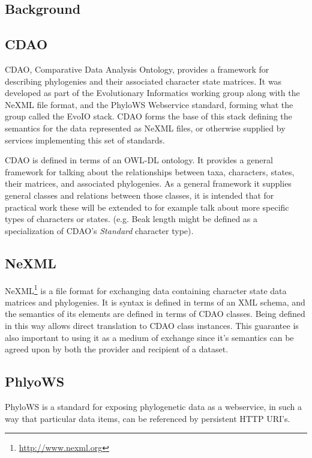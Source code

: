 \documentclass[10pt]{bmc_article}
\newenvironment{bmcformat}{\begin{raggedright}\baselineskip20pt\sloppy\setboolean{publ}{false}}{\end{raggedright}\baselineskip20pt\sloppy}
\begin{document}
\begin{bmcformat}
\section*{Background}
\subsection*{CDAO}

  CDAO, Comparative Data Analysis Ontology, provides a framework for describing phylogenies and their associated
  character state matrices. It was developed as part of the Evolutionary Informatics working group along with the
  NeXML file format, and the PhyloWS Webservice standard, forming what the group called the EvoIO stack. CDAO forms
  the base of this stack defining the semantics for the data represented as NeXML files, or otherwise supplied by
  services implementing this set of standards. 

  CDAO is defined in terms of an OWL-DL ontology. It provides a general framework
  for talking about the relationships between taxa, characters, states, their matrices, and associated 
  phylogenies. As a general framework it supplies general classes and relations between those classes, 
  it is intended that for practical work these will be extended to for example talk about more specific
  types of characters or states. (e.g. Beak length might be defined as a specialization of CDAO's \textit{Standard} 
  character type). 

\subsection*{NeXML}
  NeXML\footnote{\url{http://www.nexml.org}} is a file format for exchanging data containing character state data
  matrices and phylogenies. It is syntax is defined in terms of an XML schema, and the semantics of its elements
  are defined in terms of CDAO classes. Being defined in this way allows direct translation to CDAO class instances.
  This guarantee is also important to using it as a medium of exchange since it's semantics can be agreed upon by
  both the provider and recipient of a dataset.

\subsection*{PhlyoWS}
  PhyloWS is a standard for exposing phylogenetic data as a webservice, in such a way that particular data items,
  can be referenced by persistent HTTP URI's.


\end{bmcformat}
\end{document}
